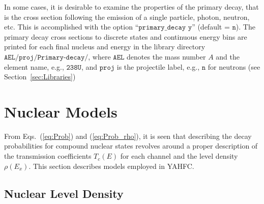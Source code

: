 \documentclass[
10pt,
showpacs,preprintnumbers,footinbib,
amsfonts,amsmath,amssymb,
aps,
prc,twocolumn,groupedaddress,superscriptaddress,
showkeys,
nofootinbib
]{revtex4-1}
\begin{document}
In some cases, it is desirable to examine the properties of the primary decay, that is the cross section following the emission of a single particle, photon, neutron, etc. This is accomplished with the option ``${\texttt{primary\_decay y}}$'' (default = ${\texttt{n}}$). The primary decay cross sections to discrete states and continuous energy bins are printed for each final nucleus and energy in the library directory ${\texttt{AEL/proj/Primary-decay/}}$, where ${\texttt{AEL}}$ denotes the mass number $A$ and the element name, e.g., ${\texttt{238U}}$, and ${\texttt{proj}}$ is the projectile label, e.g., ${\texttt{n}}$ for neutrons (see Section~\ref{sec:Libraries})

\section{Nuclear Models}
From Eqs.~(\ref{eq:Prob}) and (\ref{eq:Prob_rho}), it is seen that describing the decay probabilities for compound nuclear states revolves around a proper description of the transmission coefficients $T_c(E)$ for each channel and the level density $\rho(E_x)$. This section describes models employed in YAHFC.

\subsection{Nuclear Level Density}
\label{sec:LD}
\end{document}
